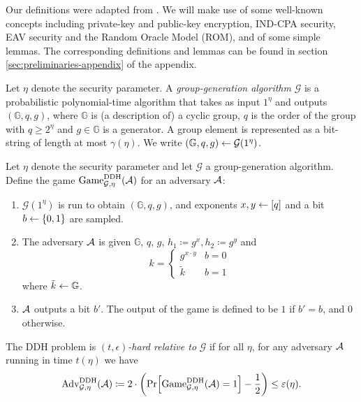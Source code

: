 Our definitions were adapted from \cite{introduction-to-modern-cryptography}. We will make use of some well-known concepts including private-key and public-key encryption, IND-CPA security, EAV security and the Random Oracle Model (ROM), and of some simple lemmas. The corresponding definitions and lemmas can be found in section \ref{sec:preliminaries-appendix} of the appendix.

\begin{definition} \label{def:group-generation-algorithm}
	Let $\eta$ denote the security parameter. A \emph{group-generation algorithm} $\mathcal{G}$ is a probabilistic polynomial-time algorithm that takes as input $1^\eta$ and outputs $(\mathbb{G}, q, g)$, where $\mathbb{G}$ is (a description of) a cyclic group, $q$ is the order of the group with $q \ge 2^\eta$ and $g \in \mathbb{G}$ is a generator. A group element is represented as a bit-string of length at most $\gamma(\eta)$. We write $(\mathbb{G}, q, g) \leftarrow \mathcal{G}(1^\eta)$.
\end{definition}

\begin{definition}
	Let $\eta$ denote the security parameter and let $\mathcal{G}$ a group-generation algorithm.
	Define the game $\mathrm{Game}_{\mathcal{G}, \eta}^{\mathrm{DDH}}(\mathcal{A})$ for an adversary $\mathcal{A}$:
	\begin{enumerate}[1.]
		\item $\mathcal{G}(1^\eta)$ is run to obtain $(\mathbb{G}, q, g)$, and exponents $x, y \leftarrow [q]$ and a bit $b \leftarrow \{0, 1\}$ are sampled.
		\item The adversary $\mathcal{A}$ is given $\mathbb{G}$, $q$, $g$, $h_1 \coloneqq g^x, h_2 \coloneqq g^y$ and
		      \[
			      k = \begin{cases}
				      g^{x \cdot y} & b = 0 \\
				      \tilde{k}     & b = 1
			      \end{cases}
		      \]
		      where $\tilde{k} \leftarrow \mathbb{G}$.
		\item $\mathcal{A}$ outputs a bit $b'$. The output of the game is defined to be $1$ if $b' = b$, and $0$ otherwise.
	\end{enumerate}
\end{definition}

\begin{definition}
	The DDH problem is \emph{$(t, \epsilon)$-hard relative to} $\mathcal{G}$ if for all $\eta$, for any adversary $\mathcal{A}$ running in time $t(\eta)$ we have
	\begin{align*}
		\advantage{\mathcal{G}}{\eta}{DDH}(\adv) \coloneqq 2 \cdot \left(\pr{\game{\mathcal{G}}{\eta}{DDH}(\adv) = 1} - \frac{1}{2}\right) \le \epsilon(\eta).
	\end{align*}
\end{definition}

